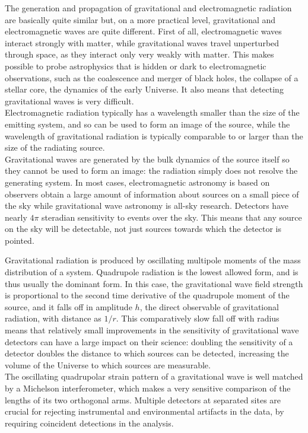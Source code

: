 \documentclass[binding=0.6cm, LaM]{sapthesis}
\begin{document}
	The generation and propagation of gravitational and electromagnetic radiation are basically quite similar but, 
	on a more practical level, gravitational and electromagnetic waves are quite different.
	First of all, electromagnetic waves interact strongly with matter, while gravitational waves travel unperturbed through space, 
	as they interact only very weakly with matter. This makes possible to probe astrophysics that is hidden or dark 
	to electromagnetic observations, such as the coalescence and merger of black holes, the collapse of a stellar core, 
	the dynamics of the early Universe. It also means that detecting gravitational waves is very difficult. \\
	Electromagnetic radiation typically has a wavelength smaller than the size of the emitting system, 
	and so can be used to form an image of the source, while the wavelength of gravitational radiation is typically comparable 
	to or larger than the size of the radiating source. \\
	Gravitational waves are generated by the bulk dynamics of the source itself so they cannot be used to form an image: 
	the radiation simply does not resolve the generating system. 
	In most cases, electromagnetic astronomy is based on observers obtain a large amount of information about sources on a small piece 
	of the sky while gravitational wave astronomy is all-sky research.
	Detectors have nearly $4\pi$ steradian sensitivity to events over the sky. This means that any source on the sky will be detectable, 
	not just sources towards which the detector is pointed. 

	Gravitational radiation is produced by oscillating multipole moments of the mass distribution of a system. 
	Quadrupole radiation is the lowest allowed form, and is thus usually the dominant form. 
	In this case, the gravitational wave field strength is proportional to the second time derivative of the quadrupole moment of the source, 
	and it falls off in amplitude $h$, the direct observable of gravitational radiation, with distance as $1/r$. 
	This comparatively slow fall off with radius means that relatively small improvements in the sensitivity 
	of gravitational wave detectors can have a large impact on their science:
	doubling the sensitivity of a detector doubles the distance to which sources can be detected, 
	increasing the volume of the Universe to which sources are measurable. \\ 
	The oscillating quadrupolar strain pattern of a gravitational wave is well matched by a Michelson interferometer, 
	which makes a very sensitive comparison of the lengths of its two orthogonal arms. 
	Multiple detectors at separated sites are crucial for rejecting instrumental and environmental artifacts in the data, 
	by requiring coincident detections in the analysis. 
\end{document}

